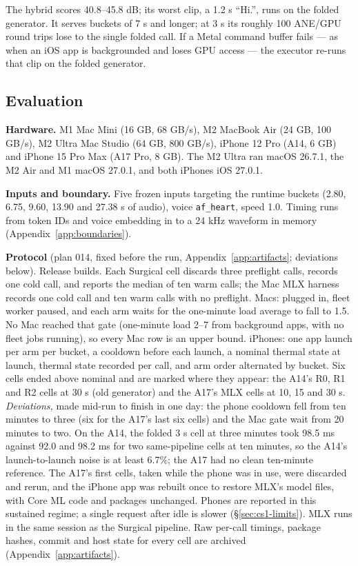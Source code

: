 \documentclass[11pt]{article}
\newcommand{\code}[1]{\texttt{#1}}
\begin{document}
The hybrid scores 40.8--45.8 dB; its worst clip, a 1.2 s ``Hi.'', runs on the folded generator. It serves buckets of 7 s and longer; at 3 s its roughly 100 ANE/GPU round trips lose to the single folded call. If a Metal command buffer fails --- as when an iOS app is backgrounded and loses GPU access --- the executor re-runs that clip on the folded generator.

\subsection{Evaluation}\label{sec:cs1-eval}

\textbf{Hardware.} M1 Mac Mini (16 GB, 68 GB/s), M2 MacBook Air (24 GB, 100 GB/s), M2 Ultra Mac Studio (64 GB, 800 GB/s), iPhone 12 Pro (A14, 6 GB) and iPhone 15 Pro Max (A17 Pro, 8 GB). The M2 Ultra ran macOS 26.7.1, the M2 Air and M1 macOS 27.0.1, and both iPhones iOS 27.0.1.

\textbf{Inputs and boundary.} Five frozen inputs targeting the runtime buckets (2.80, 6.75, 9.60, 13.90 and 27.38 s of audio), voice \code{af\_heart}, speed 1.0. Timing runs from token IDs and voice embedding in to a 24 kHz waveform in memory (Appendix~\ref{app:boundaries}).

\textbf{Protocol} (plan 014, fixed before the run, Appendix~\ref{app:artifacts}; deviations below). Release builds. Each Surgical cell discards three preflight calls, records one cold call, and reports the median of ten warm calls; the Mac MLX harness records one cold call and ten warm calls with no preflight. Macs: plugged in, fleet worker paused, and each arm waits for the one-minute load average to fall to 1.5. No Mac reached that gate (one-minute load 2--7 from background apps, with no fleet jobs running), so every Mac row is an upper bound. iPhones: one app launch per arm per bucket, a cooldown before each launch, a nominal thermal state at launch, thermal state recorded per call, and arm order alternated by bucket. Six cells ended above nominal and are marked where they appear: the A14's R0, R1 and R2 cells at 30 s (old generator) and the A17's MLX cells at 10, 15 and 30 s. \emph{Deviations,} made mid-run to finish in one day: the phone cooldown fell from ten minutes to three (six for the A17's last six cells) and the Mac gate wait from 20 minutes to two. On the A14, the folded 3 s cell at three minutes took 98.5 ms against 92.0 and 98.2 ms for two same-pipeline cells at ten minutes, so the A14's launch-to-launch noise is at least 6.7\%; the A17 had no clean ten-minute reference. The A17's first cells, taken while the phone was in use, were discarded and rerun, and the iPhone app was rebuilt once to restore MLX's model files, with Core ML code and packages unchanged. Phones are reported in this sustained regime; a single request after idle is slower (\S\ref{sec:cs1-limits}). MLX runs in the same session as the Surgical pipeline. Raw per-call timings, package hashes, commit and host state for every cell are archived (Appendix~\ref{app:artifacts}).
\end{document}
